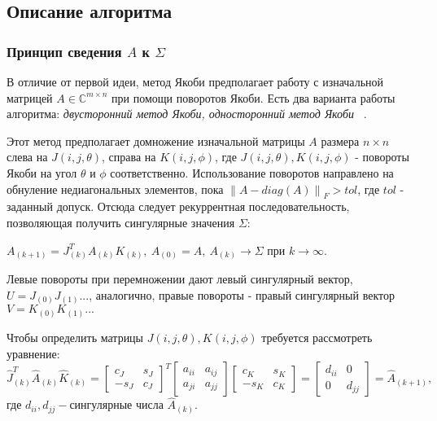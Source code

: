 \subsection{Описание алгоритма}

\subsubsection{Принцип сведения $A$ к $\Sigma$}
В отличие от первой идеи, метод Якоби предполагает работу с изначальной матрицей $A\in \mathbb{C}^{m\times n}$ при помощи поворотов Якоби. Есть два варианта работы алгоритма:\textit{ двусторонний метод Якоби, односторонний метод Якоби} ~\cite{Dongarra2018}.

Этот метод предполагает домножение изначальной матрицы $A$ размера $n\times n \ $ слева на $J(i,j,\theta)$, справа на $K(i,j,\phi)$, где $J(i,j,\theta), K(i, j,\phi)$ - повороты Якоби на угол $\theta\text{ и } \phi$ соответственно. Использование поворотов направлено на обнуление недиагональных элементов, пока $\left\| A - diag(A) \right\|_F > tol$, где $tol$ - заданный допуск.
Отсюда следует рекуррентная последовательность, позволяющая получить сингулярные значения $\Sigma$:
\begin{center}
    $A_{(k+1)} = J^T_{(k)}A_{(k)}K_{(k)}, \ A_{(0)}= A, \ A_{(k)}\longrightarrow\Sigma \text{ при } k\to\infty$.
\end{center}

Левые повороты при перемножении дают левый сингулярный вектор, $U=J_{(0)}J_{(1)}...$, аналогично, правые повороты - правый сингулярный вектор $V=K_{(0)}K_{(1)}...$

Чтобы определить матрицы $J(i,j,\theta), K(i,j,\phi)$ требуется рассмотреть уравнение:
\begin{equation} \label{two-sided Jacobi}
    \hat{J}_{(k)}^T\hat{A}_{(k)}\hat{K}_{(k)} = \begin{bmatrix}
        c_J&s_J\\
        -s_J&c_J
    \end{bmatrix}^T
    \begin{bmatrix}
        a_{ii}&a_{ij}\\
        a_{ji}&a_{jj}
    \end{bmatrix}
    \begin{bmatrix}
        c_K&s_K\\
        -s_K&c_K
    \end{bmatrix} = \begin{bmatrix}
        d_{ii} & 0\\
        0 & d_{jj}
    \end{bmatrix} = \hat{A}_{(k+1)},
\end{equation}
где $d_{ii}, d_{jj} -\text{сингулярные числа } \hat{A}_{(k)}$.

